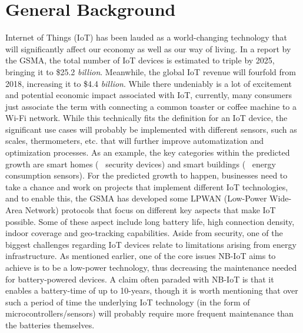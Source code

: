 






\section{General Background}
Internet of Things (IoT) has been lauded as a world-changing technology that will significantly affect our economy as well as our way of living. In a report by the GSMA, the total number of IoT devices is estimated to triple by 2025, bringing it to \$25.2 \textit{billion}.\cite{gsma-report} Meanwhile, the global IoT revenue will fourfold from 2018, increasing it to \$4.4 \textit{billion}.\cite{gsma-report} While there undeniably is a lot of excitement and potential economic impact associated with IoT, currently, many consumers just associate the term with connecting a common toaster or coffee machine to a Wi-Fi network. While this technically fits the definition for an IoT device,\cite{what_is_iot} the significant use cases will probably be implemented with different sensors, such as scales, thermometers, etc. that will further improve automatization and optimization processes. As an example, the key categories within the predicted growth are smart homes (\eg~ security devices) and smart buildings (\eg~ energy consumption sensors).\cite{gsma-report} For the predicted growth to happen, businesses need to take a chance and work on projects that implement different IoT technologies, and to enable this, the GSMA has developed some LPWAN (Low-Power Wide-Area Network) protocols that focus on different key aspects that make IoT possible. Some of these aspect include long battery life, high connection density, indoor coverage and geo-tracking capabilities. Aside from security, one of the biggest challenges regarding IoT devices relate to limitations arising from energy infrastructure. As mentioned earlier, one of the core issues NB-IoT aims to achieve is to be a low-power technology, thus decreasing the maintenance needed for battery-powered devices. A claim often paraded with NB-IoT is that it enables a battery-time of up to 10-years\cite{gsma-nb-iot}, though it is worth mentioning that over such a period of time the underlying IoT technology (in the form of microcontrollers/sensors) will probably require more frequent maintenance than the batteries themselves.

